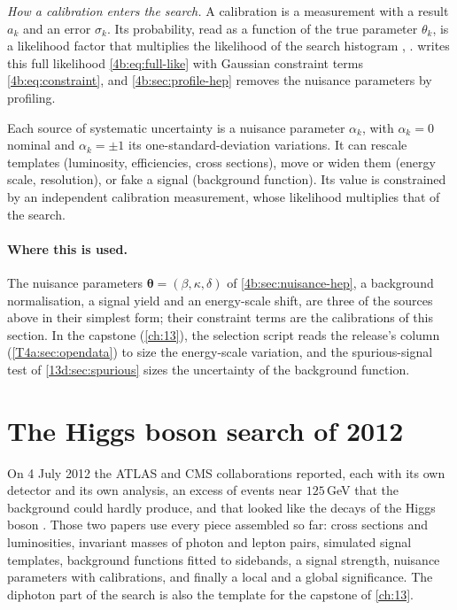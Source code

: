\emph{How a calibration enters the search.} A calibration is a measurement with a result $a_k$ and an error $\sigma_k$. Its probability, read as a function of the true parameter $\theta_k$, is a likelihood factor that multiplies the likelihood of the search histogram \cite[(40.17)]{PDG2024}, \cite[Sec.~2.2]{Cranmer2015}.  writes this full likelihood \eqref{4b:eq:full-like} with Gaussian constraint terms \eqref{4b:eq:constraint}, and \cref{4b:sec:profile-hep} removes the nuisance parameters by profiling.

\begin{keyidea}
Each source of systematic uncertainty is a nuisance parameter $\alpha_k$, with $\alpha_k=0$ nominal and $\alpha_k=\pm1$ its one-standard-deviation variations. It can rescale templates (luminosity, efficiencies, cross sections), move or widen them (energy scale, resolution), or fake a signal (background function). Its value is constrained by an independent calibration measurement, whose likelihood multiplies that of the search.
\end{keyidea}

\paragraph{Where this is used.}
The nuisance parameters $\bm\theta=(\beta,\kappa,\delta)$ of \cref{4b:sec:nuisance-hep}, a background normalisation, a signal yield and an energy-scale shift, are three of the sources above in their simplest form; their constraint terms are the calibrations of this section. In the capstone (\cref{ch:13}), the selection script  reads the release's  column (\cref{T4a:sec:opendata}) to size the energy-scale variation, and the spurious-signal test of \cref{13d:sec:spurious} sizes the uncertainty of the background function.
\section{The Higgs boson search of 2012}
\label{T4a:sec:higgs}

On 4 July 2012 the ATLAS and CMS collaborations reported, each with its own detector and its own analysis, an excess of events near $125$\,GeV that the background could hardly produce, and that looked like the decays of the Higgs boson \cite{AadHiggs2012,ChatrchyanHiggs2012}. Those two papers use every piece assembled so far: cross sections and luminosities, invariant masses of photon and lepton pairs, simulated signal templates, background functions fitted to sidebands, a signal strength, nuisance parameters with calibrations, and finally a local and a global significance. The diphoton part of the search is also the template for the capstone of \cref{ch:13}.

